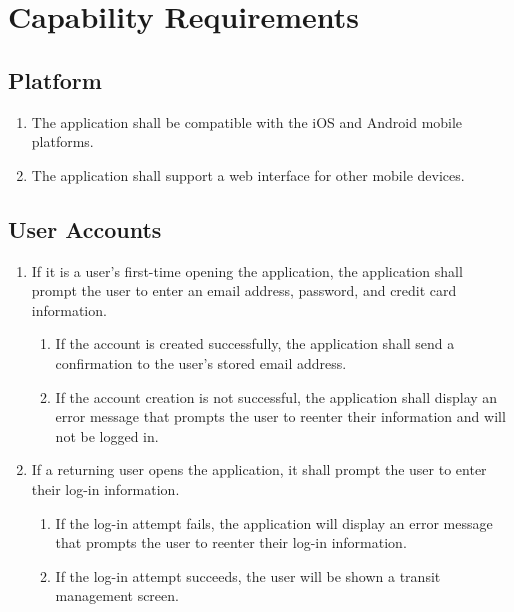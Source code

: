 \section{Capability Requirements}

	\subsection{Platform}\begin{frame}\begin{enumerate}
		\item The application shall be compatible with the iOS and Android mobile platforms.
		\item The application shall support a web interface for other mobile devices.
	\end{enumerate}\end{frame}
	
	\subsection{User Accounts}\begin{frame}\begin{enumerate}
		\item If it is a user’s first-time opening the application, the application shall prompt the user to enter an email address, password, and credit card information.
		\begin{enumerate}
			\item If the account is created successfully, the application shall send a confirmation to the user’s stored email address.
			\item If the account creation is not successful, the application shall display an error message that prompts the user to reenter their information and will not be logged in.
		\end{enumerate}
		\item If a returning user opens the application, it shall prompt the user to enter their log-in information.
			\begin{enumerate}
				\item If the log-in attempt fails, the application will display an error message that prompts the user to reenter their log-in information.
				\item If the log-in attempt succeeds, the user will be shown a transit management screen.
			\end{enumerate}
	\end{enumerate}\end{frame}
	
